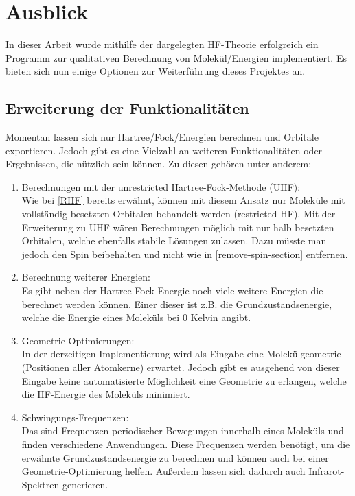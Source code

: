 \chapter{Ausblick}

In dieser Arbeit wurde mithilfe der dargelegten HF-Theorie
erfolgreich ein Programm zur qualitativen Berechnung von Molekül\-/Energien
implementiert. Es bieten sich nun einige Optionen zur Weiterführung dieses Projektes an.

\section{Erweiterung der Funktionalitäten}
Momentan lassen sich nur Hartree\-/Fock\-/Energien berechnen und Orbitale exportieren.
Jedoch gibt es eine Vielzahl an weiteren Funktionalitäten oder Ergebnissen, die nützlich sein können.
Zu diesen gehören unter anderem:
\begin{enumerate}
    \item Berechnungen mit der unrestricted Hartree-Fock-Methode (UHF):\\
            Wie bei \cref{RHF} bereits erwähnt, können mit diesem Ansatz 
            nur Moleküle mit vollständig besetzten Orbitalen behandelt werden (restricted HF).
            Mit der Erweiterung zu UHF wären Berechnungen möglich
            mit nur halb besetzten Orbitalen, welche ebenfalls stabile
            Lösungen zulassen. 
            Dazu müsste man jedoch den Spin beibehalten
            und nicht wie in \cref*{remove-spin-section} entfernen.
    \item Berechnung weiterer Energien:\\
            Es gibt neben der Hartree-Fock-Energie noch
            viele weitere Energien die berechnet werden können.
            Einer dieser ist z.B. die Grundzustandsenergie, welche die Energie
            eines Moleküls bei 0 Kelvin angibt. \cite[S. 40]{lewars_2016}
    \item Geometrie-Optimierungen:\\
            In der derzeitigen Implementierung wird als Eingabe
            eine Molekülgeometrie (Positionen aller Atomkerne) erwartet.
            Jedoch gibt es ausgehend von dieser Eingabe keine automatisierte Möglichkeit
            eine Geometrie zu erlangen, welche die HF-Energie des Moleküls minimiert.
    \item Schwingungs-Frequenzen:\\
            Das sind Frequenzen periodischer Bewegungen innerhalb eines Moleküls
            und finden verschiedene Anwendungen. Diese Frequenzen werden benötigt,
            um die erwähnte Grundzustandsenergie zu berechnen und können auch bei einer
            Geometrie-Optimierung helfen. Außerdem lassen sich dadurch auch
            Infrarot-Spektren generieren.\cite[2.5, 5.5.3]{lewars_2016}
\end{enumerate}

